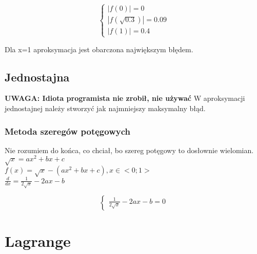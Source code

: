 \documentclass{article}
\begin{document}
\begin{equation*}\begin{cases}
    |f(0)| = 0\\
    |f(\sqrt{0.3})|=0.09\\
    |f(1)| = 0.4
\end{cases}\end{equation*}

Dla x=1 aproksymacja jest obarczona największym błędem.

\subsection{Jednostajna}
\textbf{UWAGA: Idiota programista nie zrobił, nie używać}
W aproksymacji jednostajnej należy stworzyć jak najmniejszy maksymalny błąd.\\
\subsubsection{Metoda szeregów potęgowych}
Nie rozumiem do końca, co chciał, bo szereg potęgowy to dosłownie wielomian.\\
$\sqrt{x}=ax^2+bx+c$\\
$f(x)=\sqrt{x}-(ax^2+bx+c), x\in<0;1>$\\
$\frac{d}{dx}=\frac{1}{2\sqrt{x}}-2ax-b$

\begin{equation*}\begin{cases}
    \frac{1}{2\sqrt{x}}-2ax-b=0
\end{cases}\end{equation*}


\section{Lagrange}
\end{document}
